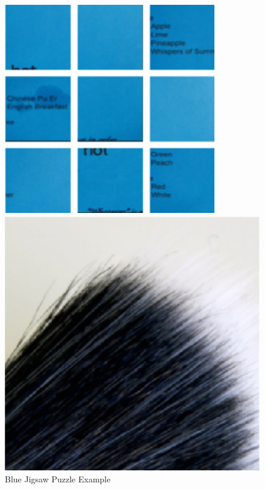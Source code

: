 \documentclass{article}
\begin{document}
\begin{figure}
\begin{minipage}{\textwidth}
\begin{minipage}{.49\textwidth}
\begin{minipage}{.49\textwidth}
                \includegraphics[width=\textwidth]{puzzle_blue}
            \end{minipage}
            \caption{Blue Jigsaw Puzzle Example}
            \label{fig:bluejigsawpuzzle}
        \end{minipage}
        \begin{minipage}{.49\textwidth}
            \begin{minipage}{.49\textwidth}
                \centering
                \includegraphics[width=\textwidth]{origin_texure}

\end{minipage}
\end{minipage}
\end{minipage}
\end{figure}
\end{document}
